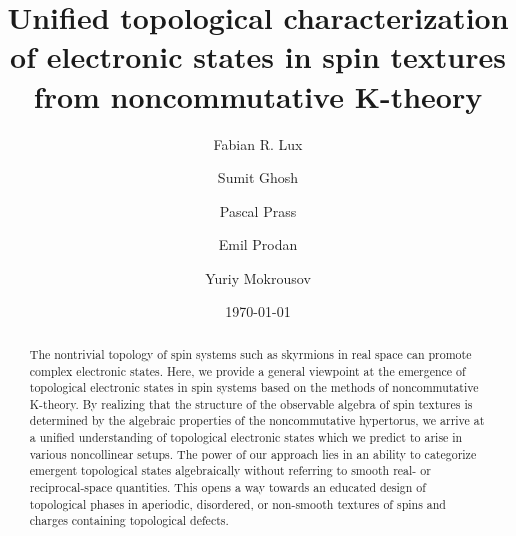 \documentclass[
    10pt,
    aps,
    prl,
    twocolumn,
    floatfix,
    superscriptaddress
]{revtex4-2}
\begin{document}

\setcounter{secnumdepth}{2} 


\title{
\texorpdfstring{
    Unified  topological characterization of electronic states in spin textures \\ from noncommutative K-theory
    }
    {
    Unified  topological characterization of electronic states in spin textures from noncommutative K-theory
    }
}

\author{Fabian R. Lux}
    \affiliation{\mainz}
    \affiliation{\nyc}

\author{Sumit Ghosh}
   \affiliation{\pgi} 
   
\author{Pascal Prass}
    \affiliation{\mainz}
    
\author{Emil Prodan}
    \affiliation{\nyc}
    
\author{Yuriy Mokrousov}
    \affiliation{\mainz}
    \affiliation{\pgi}

\date{\today}

\begin{abstract}
The nontrivial topology of spin systems such as skyrmions in real space can promote complex electronic states.
Here, we provide a general viewpoint at the emergence of topological electronic states in spin systems based on the methods of noncommutative K-theory. 
By realizing that the structure of the observable algebra of spin textures is determined by the algebraic properties of the noncommutative hypertorus, we arrive at a unified understanding of topological electronic states which we predict to arise in various noncollinear setups. 
The power of our approach lies in an ability to categorize emergent topological states algebraically without referring to smooth real- or reciprocal-space quantities. 
This opens a way towards an educated design of topological phases in aperiodic, disordered, or non-smooth textures of spins and charges containing topological defects. 
\end{abstract}


\maketitle

\end{document}
